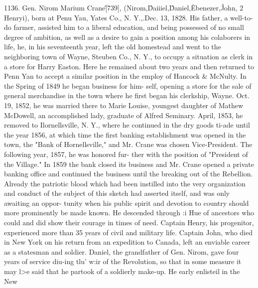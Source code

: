\documentclass{book}
\begin{document}
1136. Gen. Nirom Marium Crane\^ [739], (Nirom,\^ Daiiiel,\^ 
Daniel,\^ Ebenezer,\^ John, 2 Henryi), born at Penu Yau, Yates 
Co., N. Y.,.Dec. 13, 1828. His father, a well-to-do farmer, 
assisted him to a liberal education, and being possessed of no 
small degree of ambition, as well as a desire to gain a position 
among his colaborers in life, he, in his seventeenth year, left the old 
homestead and went to the neighboring town of Wayne, Steuben 
Co., N. Y., to occupy a situation as clerk in a store for Harry 
Easton. Here he remained about two years and then returned to 
Penn Yan to accept a similar position in the employ of Hancock 
\& McNulty. In the Spring of 1849 he began business for him- 
self, opening a store for the sale of general merchandise in the 
town where he first began his clerkship, Wayne. Oct. 19, 1852, 
he was married there to Marie Louise, youngest daughter of 
Mathew McDowell, an accomplished lady, graduate of Alfred 
Seminary. April, 1853, he removed to Ilornellsville, N. Y., 
where he continued in the dry goods ti-ade until the year 1856, at 
which time the first banking establishment was opened in the 
town, the "Bank of Hornellsville," and Mr. Crane was chosen 
Vice-President. The following year, 1857, he was honored fur- 
ther with the position of "President of the Village." In 1859 
the bank closed its business and Mr. Crane opened a private 
banking office and continued the business until the breaking out 
of the Rebellion. Already the patriotic blood which had been 
instilled into the very organization and conduct of the subject 
of this sketch had asserted itself, and was only awaiting an oppor- 
tunity when his public spirit and devotion to country should more 
prominently be made known. He descended through :i Hue of 
ancestors who could and did show their courage in times of need. 
Captain Henry, his progenitor, experienced more than 35 years 
of civil and military life. Captain John, who died in New York 
on his return from an expedition to Canada, left an enviable 
career as a statesman and soldier. Daniel, the grandfather of 
Gen. Nirom, gave four years of service diu-ing tlu' w:ir of the 
Revolution, so that in some measure it may l>e said that he 
partook of a soldierly make-up. He early enlisteil in the New 
\end{document}
